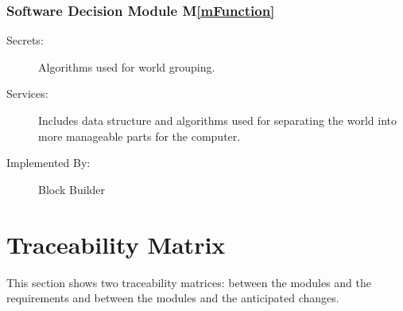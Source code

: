 \documentclass[12pt, titlepage]{article}
\newcommand{\mref}[1]{M\ref{#1}}
\begin{document}
\subsubsection{Software Decision Module \mref{mFunction}}

\begin{description}
\item[Secrets:] Algorithms used for world grouping.
\item[Services:] Includes data structure and algorithms used for separating the world into more manageable parts for the computer.
\item[Implemented By:] Block Builder
\end{description}

\section{Traceability Matrix} \label{SecTM}

This section shows two traceability matrices: between the modules and the
requirements and between the modules and the anticipated changes.
\end{document}
